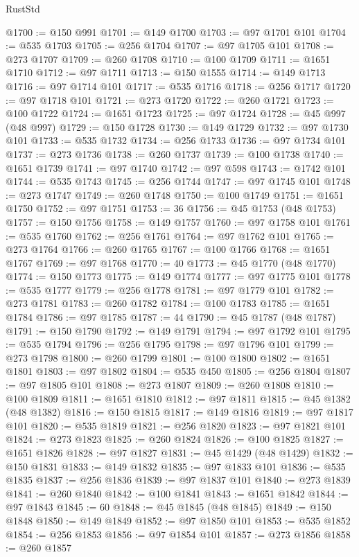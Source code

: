\begin{lexlean}{RustStd}
\begin{coremodule}
@1700 := @150 @991
@1701 := @149 @1700
@1703 := @97 @1701 @101
@1704 := @535 @1703
@1705 := @256 @1704
@1707 := @97 @1705 @101
@1708 := @273 @1707
@1709 := @260 @1708
@1710 := @100 @1709
@1711 := @1651 @1710
@1712 := @97 @1711
@1713 := @150 @1555
@1714 := @149 @1713
@1716 := @97 @1714 @101
@1717 := @535 @1716
@1718 := @256 @1717
@1720 := @97 @1718 @101
@1721 := @273 @1720
@1722 := @260 @1721
@1723 := @100 @1722
@1724 := @1651 @1723
@1725 := @97 @1724
@1728 := @45 @997 (@48 @997)
@1729 := @150 @1728
@1730 := @149 @1729
@1732 := @97 @1730 @101
@1733 := @535 @1732
@1734 := @256 @1733
@1736 := @97 @1734 @101
@1737 := @273 @1736
@1738 := @260 @1737
@1739 := @100 @1738
@1740 := @1651 @1739
@1741 := @97 @1740
@1742 := @97 @598
@1743 := @1742 @101
@1744 := @535 @1743
@1745 := @256 @1744
@1747 := @97 @1745 @101
@1748 := @273 @1747
@1749 := @260 @1748
@1750 := @100 @1749
@1751 := @1651 @1750
@1752 := @97 @1751
@1753 := 36
@1756 := @45 @1753 (@48 @1753)
@1757 := @150 @1756
@1758 := @149 @1757
@1760 := @97 @1758 @101
@1761 := @535 @1760
@1762 := @256 @1761
@1764 := @97 @1762 @101
@1765 := @273 @1764
@1766 := @260 @1765
@1767 := @100 @1766
@1768 := @1651 @1767
@1769 := @97 @1768
@1770 := 40
@1773 := @45 @1770 (@48 @1770)
@1774 := @150 @1773
@1775 := @149 @1774
@1777 := @97 @1775 @101
@1778 := @535 @1777
@1779 := @256 @1778
@1781 := @97 @1779 @101
@1782 := @273 @1781
@1783 := @260 @1782
@1784 := @100 @1783
@1785 := @1651 @1784
@1786 := @97 @1785
@1787 := 44
@1790 := @45 @1787 (@48 @1787)
@1791 := @150 @1790
@1792 := @149 @1791
@1794 := @97 @1792 @101
@1795 := @535 @1794
@1796 := @256 @1795
@1798 := @97 @1796 @101
@1799 := @273 @1798
@1800 := @260 @1799
@1801 := @100 @1800
@1802 := @1651 @1801
@1803 := @97 @1802
@1804 := @535 @450
@1805 := @256 @1804
@1807 := @97 @1805 @101
@1808 := @273 @1807
@1809 := @260 @1808
@1810 := @100 @1809
@1811 := @1651 @1810
@1812 := @97 @1811
@1815 := @45 @1382 (@48 @1382)
@1816 := @150 @1815
@1817 := @149 @1816
@1819 := @97 @1817 @101
@1820 := @535 @1819
@1821 := @256 @1820
@1823 := @97 @1821 @101
@1824 := @273 @1823
@1825 := @260 @1824
@1826 := @100 @1825
@1827 := @1651 @1826
@1828 := @97 @1827
@1831 := @45 @1429 (@48 @1429)
@1832 := @150 @1831
@1833 := @149 @1832
@1835 := @97 @1833 @101
@1836 := @535 @1835
@1837 := @256 @1836
@1839 := @97 @1837 @101
@1840 := @273 @1839
@1841 := @260 @1840
@1842 := @100 @1841
@1843 := @1651 @1842
@1844 := @97 @1843
@1845 := 60
@1848 := @45 @1845 (@48 @1845)
@1849 := @150 @1848
@1850 := @149 @1849
@1852 := @97 @1850 @101
@1853 := @535 @1852
@1854 := @256 @1853
@1856 := @97 @1854 @101
@1857 := @273 @1856
@1858 := @260 @1857

\end{coremodule}
\end{lexlean}
